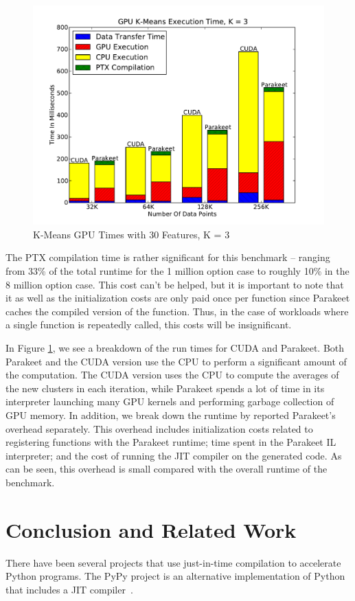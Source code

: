 \documentclass[10pt,twocolumn]{article}
\begin{document}
\begin{figure}
\includegraphics[scale=0.4]{KMGPU.pdf}
\caption{K-Means GPU Times with 30 Features, K = 3}
\label{KMGPU}
\end{figure}

The PTX compilation time is rather significant for this benchmark -- ranging from 33\% of the total runtime for the 1 million option case to roughly 10\% in the 8 million option case.  This cost can't be helped, but it is important to note that it as well as the initialization costs are only paid once per function since Parakeet caches the compiled version of the function.  Thus, in the case of workloads where a single function is repeatedly called, this costs will be insignificant.

In Figure \ref{KMGPU}, we see a breakdown of the run times for CUDA and Parakeet.  Both Parakeet and the CUDA version use the CPU to perform a significant amount of the computation.  The CUDA version uses the CPU to compute the averages of the new clusters in each iteration, while Parakeet spends a lot of time in its interpreter launching many GPU kernels and performing garbage collection of GPU memory.  In addition, we break down the runtime by reported Parakeet's overhead separately.  This overhead includes initialization costs related to registering functions with the Parakeet runtime; time spent in the Parakeet IL interpreter; and the cost of running the JIT compiler on the generated code.  As can be seen, this overhead is small compared with the overall runtime of the benchmark.

\section{Conclusion and Related Work}
\label{Conclusion}
There have been several projects that use just-in-time compilation to accelerate Python programs.  The PyPy project is an alternative implementation of Python that includes a JIT compiler~\cite{Rigo06}.
\end{document}
